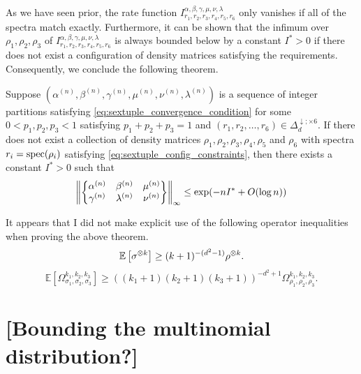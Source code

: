 \documentclass[notitlepage, 10pt]{article}
\begin{document}
As we have seen prior, the rate function $I_{r_1, r_2, r_3, r_4, r_5, r_6}^{\alpha, \beta, \gamma, \mu, \nu, \lambda}$ only vanishes if all of the spectra match exactly.
Furthermore, it can be shown that the infimum over $\rho_1, \rho_2, \rho_3$ of $I_{r_1, r_2, r_3, r_4, r_5, r_6}^{\alpha, \beta, \gamma, \mu, \nu, \lambda}$ is always bounded below by a constant $I^{*} > 0$ if there does not exist a configuration of density matrices satisfying the requirements.
Consequently, we conclude the following theorem.
\begin{thm}
    Suppose $(\alpha^{(n)}, \beta^{(n)}, \gamma^{(n)}, \mu^{(n)}, \nu^{(n)}, \lambda^{(n)})$ is a sequence of integer partitions satisfying \cref{eq:sextuple_convergence_condition} for some $0 < p_1, p_2, p_3 < 1$ satisfying $p_1 + p_2 + p_3 = 1$ and $(r_1, r_2, \ldots, r_6) \in \Delta_{d}^{\downarrow; \times 6}$.
    If there does not exist a collection of density matrices $\rho_1, \rho_2, \rho_3, \rho_4, \rho_5$ and $\rho_6$ with spectra $r_i = \operatorname{spec}(\rho_i)$ satisfying \cref{eq:sextuple_config_constraints}, then there exists a constant $I^{*} > 0$ such that
    \begin{equation}
        \label{eq:sequential_recoupling_norm_upper_bound_old}
        \left\lVert\begin{Bmatrix} \alpha^{(n)} & \beta^{(n)} & \mu^{(n)} \\ \gamma^{(n)} & \lambda^{(n)} & \nu^{(n)} \end{Bmatrix}\right\rVert_{\infty}
        \leq \exp(-n I^{*} + O(\log n))
    \end{equation}
\end{thm}

\begin{rem}
    It appears that I did not make explicit use of the following operator inequalities when proving the above theorem.
    \begin{equation}
        \mathbb E\left[ \sigma^{\otimes k} \right] \geq (k+1)^{-(d^2-1)} \rho^{\otimes k}.
    \end{equation}
    \begin{equation}
        \mathbb E\left[\Omega_{\sigma_1,\sigma_2,\sigma_3}^{k_1, k_2, k_3}\right] \geq \left((k_1+1)(k_2+1)(k_3+1)\right)^{-d^2+1}\Omega_{\rho_1,\rho_2,\rho_3}^{k_1, k_2, k_3}.
    \end{equation}
\end{rem}

\section{[Bounding the multinomial distribution?]}
\end{document}
